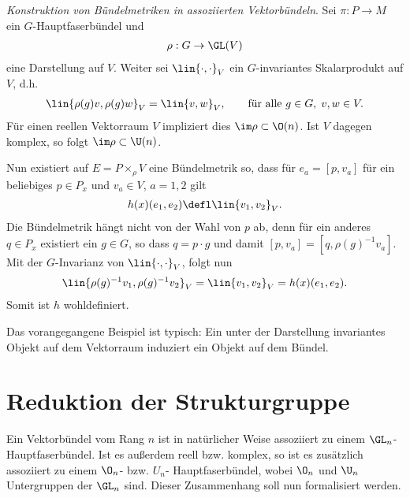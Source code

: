 \documentclass[%
	paper=a5,%
	fleqn,%
	DIV=18,%
	BCOR=0mm,
	fontsize=11pt,
	titlepage=false,%
	bibliography=totoc,
	DIV=18,%
	twoside=true,
	pdftitle=Riemannsche Geometrie,
	pdfauthor=Uwe Semmelmann,
	numbers=noendperiod]%
	{scrbook}
\begin{document}
\begin{ex}
\begin{exenum}
\item \textit{Konstruktion von Bündelmetriken in assoziierten Vektorbündeln}.
Sei $\pi: P\to M$ ein $G$-Hauptfaserbündel und
\begin{align*}
\rho: G\to \GL(V)
\end{align*}
eine Darstellung auf $V$. Weiter sei $\lin{\cdot,\cdot}_V$ ein $G$-invariantes
Skalarprodukt auf $V$, d.h.
\begin{align*}
\lin{\rho(g)v,\rho(g)w}_V = \lin{v,w}_V,\qquad \text{für alle }g\in G,\; v,w\in
V.
\end{align*}
Für einen reellen Vektorraum $V$ impliziert dies $\im
\rho\subset\O(n)$. Ist $V$ dagegen komplex, so folgt $\im\rho\subset\U(n)$.

Nun existiert auf $E=P\times_\rho V$ eine Bündelmetrik so, dass für $e_a =
[p,v_a]$ für ein beliebiges $p\in P_x$ und $v_a\in V$, $a=1,2$ gilt
\begin{align*}
h(x)(e_1,e_2) \defl \lin{v_1,v_2}_V.
\end{align*}
Die Bündelmetrik hängt nicht von der Wahl von $p$ ab, denn für ein anderes
$q\in P_x$ existiert ein $g\in G$, so dass $q = p\cdot g$ und damit $[p,v_a] =
[q,\rho(g)^{-1} v_a]$. Mit der $G$-Invarianz von $\lin{\cdot,\cdot}_V$, folgt
nun
\begin{align*}
\lin{\rho(g)^{-1}v_1,\rho(g)^{-1}v_2}_V = \lin{v_1,v_2}_V = h(x)(e_1,e_2).
\end{align*}
Somit ist $h$ wohldefiniert.
\item Das vorangegangene Beispiel ist typisch: Ein unter der Darstellung
invariantes Objekt auf dem Vektorraum induziert ein Objekt auf dem Bündel.\boxc  
\end{exenum}
\end{ex}

\section{Reduktion der Strukturgruppe}

Ein Vektorbündel vom Rang $n$ ist in natürlicher Weise assoziiert zu einem
$\GL_n$-Hauptfaserbündel. Ist es außerdem reell bzw. komplex, so ist es
zusätzlich assoziiert zu einem $\O_n$- bzw. $U_n$- Hauptfaserbündel, wobei
$\O_n$ und $\U_n$ Untergruppen der $\GL_n$ sind. Dieser Zusammenhang soll nun
formalisiert werden.
\end{document}

